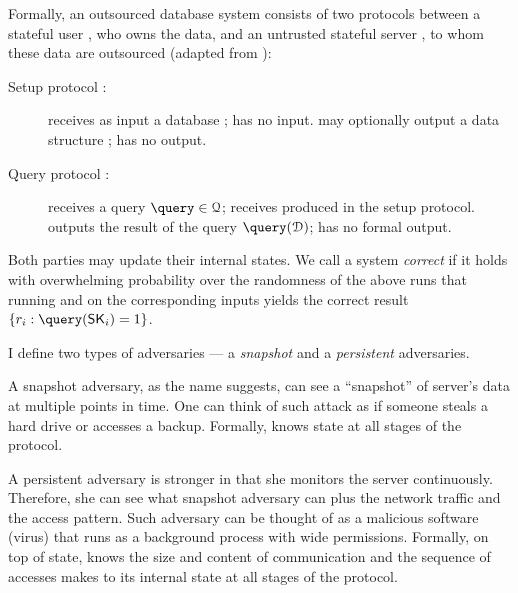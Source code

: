 		Formally, an outsourced database system consists of two protocols between a stateful user \user{}, who owns the data, and an untrusted stateful server \server{}, to whom these data are outsourced (adapted from \cite{epsolute}): %
		\begin{description}
			\item[Setup protocol \protocolSetup{}:]
				\user{} receives as input a database \databaseDef{}; \server{} has no input.
				\server{} may optionally output a data structure \serverDS{}; \user{} has no output.

			\item[Query protocol \protocolQuery{}:]
				\user{} receives a query $\query \in \querySet$; \server{} receives \serverDS{} produced in the setup protocol.
				\user{} outputs the result of the query $\query( \database )$; \server{} has no formal output.
		\end{description}
		Both parties may update their internal states.
		We call a system \emph{correct} if it holds with overwhelming probability over the randomness of the above runs that running \protocolSetup{} and  \protocolQuery{} on the corresponding inputs yields the correct result $\{ \record_i : \query( \searchKey_i ) = 1 \}$.

		I define two types of adversaries --- a \emph{snapshot} and a \emph{persistent} adversaries.

		A snapshot adversary, as the name suggests, can see a ``snapshot'' of server's data at multiple points in time.
		One can think of such attack as if someone steals a hard drive or accesses a backup.
		Formally, \adversary{} knows \server{} state at all stages of the protocol.

		A persistent adversary is stronger in that she monitors the server continuously.
		Therefore, she can see what snapshot adversary can plus the network traffic and the access pattern.
		Such adversary can be thought of as a malicious software (virus) that runs as a background process with wide permissions.
		Formally, on top of \server{} state, \adversary{} knows the size and content of \server{} communication and the sequence of accesses \server{} makes to its internal state at all stages of the protocol.

